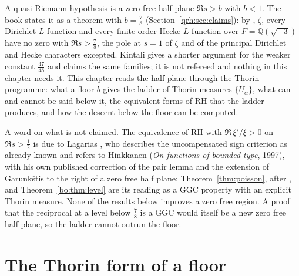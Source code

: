\label{qt:ch:ladder}
A quasi Riemann hypothesis is a zero free half plane $\Re s>b$ with $b<1$. The book states it as a theorem with $b=\frac78$ (Section~\ref{qrh:sec:claims}): by \cite{OAI26a}, $\zeta$, every Dirichlet $L$ function and every finite order Hecke $L$ function over $F=\mathbb Q(\sqrt{-3})$ have no zero with $\Re s>\frac78$, the pole at $s=1$ of $\zeta$ and of the principal Dirichlet and Hecke characters excepted. Kintali \cite{Kin26} gives a shorter argument for the weaker constant $\frac{47}{48}$ and claims the same families; it is not refereed and nothing in this chapter needs it. This chapter reads the half plane through the Thorin programme: what a floor $b$ gives the ladder of Thorin measures $\{U_\alpha\}$, what can and cannot be said below it, the equivalent forms of RH that the ladder produces, and how the descent below the floor can be computed.

A word on what is not claimed. The equivalence of RH with $\Re\,\xi'/\xi>0$ on $\Re s>\frac12$ is due to Lagarias \cite{Lagarias}, who describes the uncompensated sign criterion as already known and refers to Hinkkanen (\emph{On functions of bounded type}, 1997), with his own published correction of the pair lemma and the extension of Garunk\v{s}tis \cite{Garunkstis02} to the right of a zero free half plane; Theorem~\ref{thm:poisson}, after \cite{P26}, and Theorem~\ref{bo:thm:level} are its reading as a GGC property with an explicit Thorin measure. None of the results below improves a zero free region. A proof that the reciprocal at a level below $\frac78$ is a GGC would itself be a new zero free half plane, so the ladder cannot outrun the floor.

\section{The Thorin form of a floor}\label{qt:sec:ladder}

